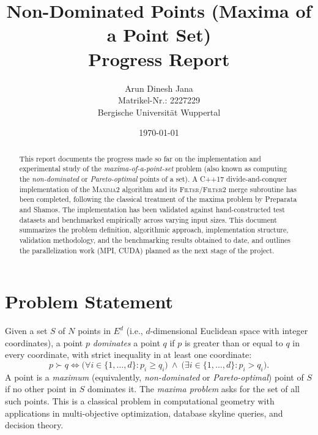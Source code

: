 \documentclass[11pt]{article}
\title{Non-Dominated Points (Maxima of a Point Set)\\
\large Progress Report}
\author{Arun Dinesh Jana \\ Matrikel-Nr.: 2227229 \\ Bergische Universit\"at Wuppertal}
\date{\today}
\begin{document}
\maketitle

\begin{abstract}
This report documents the progress made so far on the implementation and
experimental study of the \emph{maxima-of-a-point-set} problem (also known
as computing the \emph{non-dominated} or \emph{Pareto-optimal} points of a
set). A C++17 divide-and-conquer implementation of the \textsc{Maxima2}
algorithm and its \textsc{Filter}/\textsc{Filter2} merge subroutine has
been completed, following the classical treatment of the maxima problem by
Preparata and Shamos. The implementation has been validated against
hand-constructed test datasets and benchmarked empirically across varying
input sizes. This document summarizes the problem definition, algorithmic
approach, implementation structure, validation methodology, and the
benchmarking results obtained to date, and outlines the parallelization
work (MPI, CUDA) planned as the next stage of the project.
\end{abstract}

\tableofcontents

\section{Problem Statement}

Given a set $S$ of $N$ points in $E^d$ (i.e., $d$-dimensional Euclidean
space with integer coordinates), a point $p$ \emph{dominates} a point $q$
if $p$ is greater than or equal to $q$ in every coordinate, with strict
inequality in at least one coordinate:
\begin{equation}
p \succ q \iff \big(\forall i \in \{1,\dots,d\}: p_i \geq q_i\big)
\ \wedge\ \big(\exists i \in \{1,\dots,d\}: p_i > q_i\big).
\end{equation}
A point is a \emph{maximum} (equivalently, \emph{non-dominated} or
\emph{Pareto-optimal}) point of $S$ if no other point in $S$ dominates it.
The \emph{maxima problem} asks for the set of all such points. This is a
classical problem in computational geometry with applications in
multi-objective optimization, database skyline queries, and decision
theory.

\end{document}

